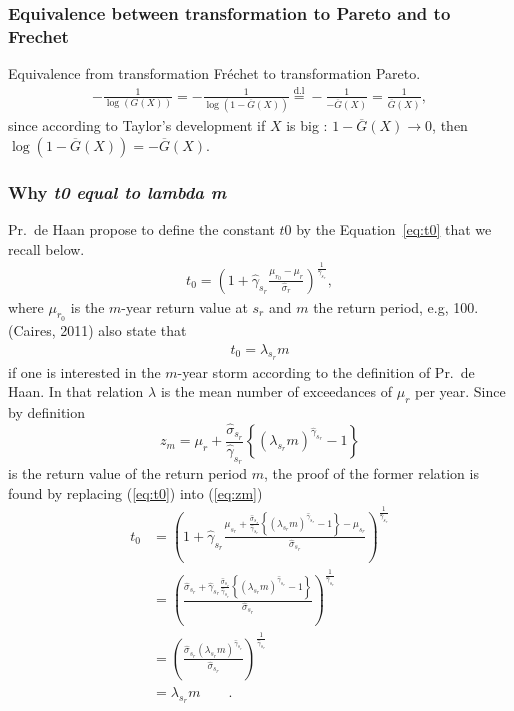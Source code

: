 \subsubsection{Equivalence between transformation to Pareto and to Frechet}
\label{sec:equivalenceParetoFrechet}
Equivalence from transformation Fr\'echet to transformation Pareto. 
\begin{align*}
-\frac{1}{\log(G(X))} = - \frac{1}{\log(1-\overline{G}(X))}  \overset{\text{d.l}}= - \frac{1}{- \overline{G}(X)} = \frac{1}{\overline{G}(X)},
\end{align*}
since according to Taylor's development if $X$ is big : $1-\overline{G}(X) \rightarrow 0$, then  $\log(1-\overline{G}(X)) = - \overline{G}(X)$.
\subsubsection{Why \textit{t0 equal to lambda m}}
\label{sec:t0lambdam}
Pr.~de Haan propose to define the constant $t0$ by the Equation~\ref{eq:t0} that we recall below.
\begin{align*}
t_0 = \left( 1+ \hat{\gamma}_{s_r}  \frac{\mu_{r_0} - \mu_{r}}{\hat{\sigma}_{r}} \right)^{\frac{1}{\hat{\gamma}_{s_r}}},
\end{align*}
where $\mu_{r_0}$ is the $m$-year return value at $s_r$ and $m$ the return period, e.g, 100.
(Caires, 2011) also state that 
\begin{align*}
t_0=\lambda_{s_r}m
\end{align*} 
if one is interested in the $m$-year storm according to the definition of Pr.~de Haan. In that relation $\lambda$ is the mean number of exceedances of $\mu_{r}$ per year. Since by definition
\begin{equation}
\label{eq:zm}
 z_m = \mu_r + \frac{{\hat{\sigma}_{s_r}}}{\hat{\gamma}_{s_r}} \left\{ \left( \lambda_{s_r} m \right) ^{\hat{\gamma}_{s_r}} - 1 \right\}
\end{equation}
is the return value of the return period $m$,
the proof of the former relation is found by replacing (\ref{eq:t0}) into (\ref{eq:zm})
\begin{align*}
t_0 &= \left(1+ \hat{\gamma}_{s_r} \frac{ \mu_{s_r} + \frac{{\hat{\sigma}_{s_r}}}{\hat{\gamma}_{s_r}} \left\{ \left( \lambda_{s_r} m \right) ^{\hat{\gamma}_{s_r}} - 1 \right\} - \mu_{s_r}}{\hat{\sigma}_{s_r}}  \right)^{\frac{1}{\hat{\gamma}_{s_r}}}\\
	&= \left(  \frac{\hat{\sigma}_{s_r} + \hat{\gamma}_{s_r} \frac{{\hat{\sigma}_{s_r}}}{\hat{\gamma}_{s_r}} \left\{ \left( \lambda_{s_r} m \right) ^{\hat{\gamma}_{s_r}} - 1 \right\}  }{\hat{\sigma}_{s_r}} \right)^{\frac{1}{\hat{\gamma}_{s_r}}}\\
	&= \left( \frac{\hat{\sigma}_{s_r} \left( \lambda_{s_r} m \right) ^{\hat{\gamma}_{s_r}} }{\hat{\sigma}_{s_r}} \right)^{\frac{1}{\hat{\gamma}_{s_r}}}\\
 	&= \lambda_{s_r}m \quad\quad.
\end{align*}
